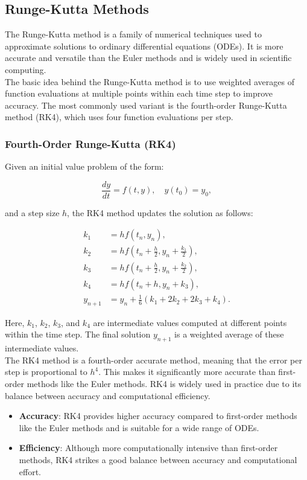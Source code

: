 \documentclass[a4paper,12pt,french]{article}
\begin{document}
\subsection{Runge-Kutta Methods}

The Runge-Kutta method \cite{butcher1996history} is a family of numerical techniques used to approximate solutions to ordinary differential equations (ODEs). It is more accurate and versatile than the Euler methods and is widely used in scientific computing.\\

The basic idea behind the Runge-Kutta method is to use weighted averages of function evaluations at multiple points within each time step to improve accuracy. The most commonly used variant is the fourth-order Runge-Kutta method (RK4), which uses four function evaluations per step.

\subsubsection{Fourth-Order Runge-Kutta (RK4)}

Given an initial value problem of the form:

\[
\frac{dy}{dt} = f(t, y), \quad y(t_0) = y_0,
\]

and a step size \(h\), the RK4 method updates the solution as follows:

\begin{align*}
k_1 &= h f(t_n, y_n), \\
k_2 &= h f(t_n + \frac{h}{2}, y_n + \frac{k_1}{2}), \\
k_3 &= h f(t_n + \frac{h}{2}, y_n + \frac{k_2}{2}), \\
k_4 &= h f(t_n + h, y_n + k_3), \\
y_{n+1} &= y_n + \frac{1}{6}(k_1 + 2k_2 + 2k_3 + k_4).
\end{align*}

Here, \(k_1\), \(k_2\), \(k_3\), and \(k_4\) are intermediate values computed at different points within the time step. The final solution \(y_{n+1}\) is a weighted average of these intermediate values.\\

The RK4 method is a fourth-order accurate method, meaning that the error per step is proportional to \(h^4\). This makes it significantly more accurate than first-order methods like the Euler methods. RK4 is widely used in practice due to its balance between accuracy and computational efficiency.

\begin{itemize}
    \item \textbf{Accuracy}: RK4 provides higher accuracy compared to first-order methods like the Euler methods and is suitable for a wide range of ODEs.
    \item \textbf{Efficiency}: Although more computationally intensive than first-order methods, RK4 strikes a good balance between accuracy and computational effort.
\end{itemize}
\end{document}
